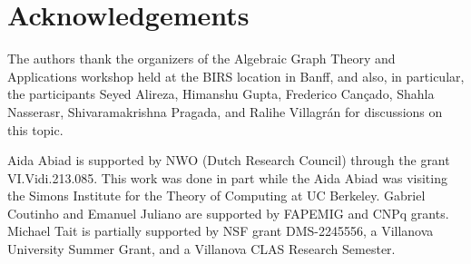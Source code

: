\documentclass[10pt,a4paper]{article}
\theoremstyle{plain}
\numberwithin{equation}{section}
\begin{document}
\section*{Acknowledgements}
The authors thank the organizers of the Algebraic Graph Theory and Applications workshop held at the BIRS location in Banff, and also, in particular, the participants Seyed Alireza,  Himanshu Gupta, Frederico Cançado, Shahla Nasserasr, Shivaramakrishna Pragada, and Ralihe Villagr\'an for discussions on this topic.


Aida Abiad is supported by NWO (Dutch Research Council) through the grant VI.Vidi.213.085. This work was done in part while the Aida Abiad was visiting the Simons Institute for the Theory of Computing at UC Berkeley. Gabriel Coutinho and Emanuel Juliano are supported by FAPEMIG and CNPq grants. Michael Tait is partially supported by NSF grant DMS-2245556, a Villanova University Summer Grant, and a Villanova CLAS Research Semester. 



\end{document}
